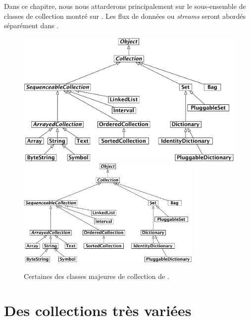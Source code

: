 \documentclass[a4paper,10pt,twoside]{book}
\begin{document}
Dans ce chapitre, nous nous attarderons principalement sur le sous-ensemble
de classes de collection montr\'e sur 
.
Les flux de donn\'ees ou \emph{streams} seront abord\'es séparément dans 
.



\begin{figure}
\begin{center}
\ifluluelse
	{\includegraphics[width=\textwidth]{CollectionHierarchy}}
	{\includegraphics[width=0.8\textwidth]{CollectionHierarchy}}
\caption{Certaines des classes majeures de collection de \squeak.}
\label{fig:CollClassesTree}
\end{center}
\end{figure}

\section{Des collections très variées}
\label{sec:varieties}
\end{document}
